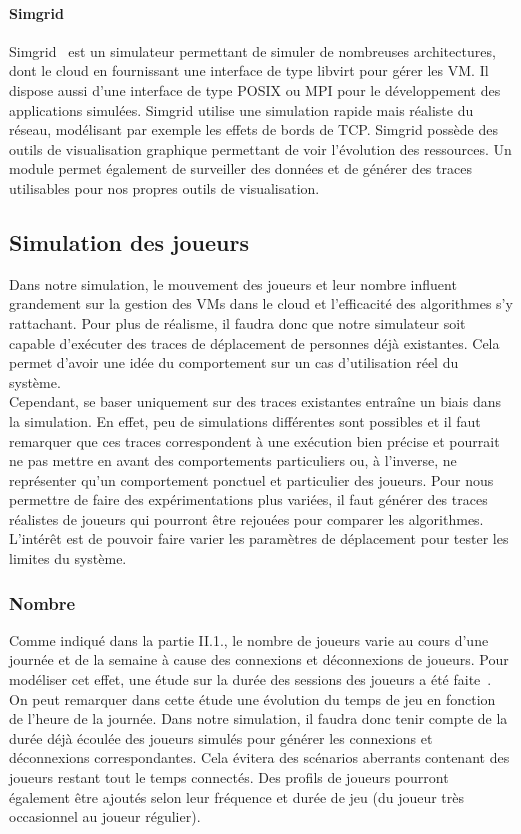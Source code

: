 \paragraph{Simgrid\\}
Simgrid~\cite{simgrid} est un simulateur permettant de simuler de nombreuses architectures, dont le cloud en fournissant une interface de type libvirt pour gérer les VM. Il dispose aussi d'une interface de type POSIX ou MPI pour le développement des applications simulées. Simgrid utilise une simulation rapide mais réaliste du réseau, modélisant par exemple les effets de bords de TCP. Simgrid possède des outils de visualisation graphique permettant de voir l'évolution des ressources. Un module permet également de surveiller des données et de générer des traces utilisables pour nos propres outils de visualisation.

\subsection{Simulation des joueurs}
Dans notre simulation, le mouvement des joueurs et leur nombre influent grandement sur la gestion des VMs dans le cloud et l'efficacité des algorithmes s'y rattachant. Pour plus de réalisme, il faudra donc que notre simulateur soit capable d'exécuter des traces de déplacement de personnes déjà existantes. Cela permet d'avoir une idée du comportement sur un cas d'utilisation réel du système.\\

Cependant, se baser uniquement sur des traces existantes entraîne un biais dans la simulation. En effet, peu de simulations différentes sont possibles et il faut remarquer que ces traces correspondent à une exécution bien précise et pourrait ne pas mettre en avant des comportements particuliers ou, à l'inverse, ne représenter qu'un comportement ponctuel et particulier des joueurs. Pour nous permettre de faire des expérimentations plus variées, il faut générer des traces réalistes de joueurs qui pourront être rejouées pour comparer les algorithmes. L'intérêt est de pouvoir faire varier les paramètres de déplacement pour tester les limites du système.

\subsubsection{Nombre}
Comme indiqué dans la partie II.1., le nombre de joueurs varie au cours d'une journée et de la semaine à cause des connexions et déconnexions de joueurs. Pour modéliser cet effet, une étude sur la durée des sessions des joueurs a été faite~\cite{mmorpg_player_behavior_model}. On peut remarquer dans cette étude une évolution du temps de jeu en fonction de l'heure de la journée. Dans notre simulation, il faudra donc tenir compte de la durée déjà écoulée des joueurs simulés pour générer les connexions et déconnexions correspondantes. Cela évitera des scénarios aberrants contenant des joueurs restant tout le temps connectés. Des profils de joueurs pourront également être ajoutés selon leur fréquence et durée de jeu (du joueur très occasionnel au joueur régulier).

